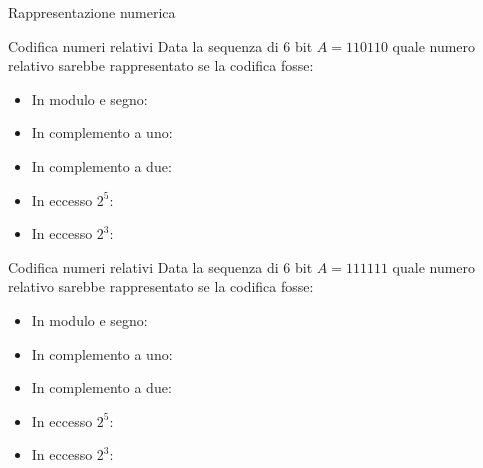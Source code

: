 \documentclass[11pt]{article}
\begin{document}
\begin{quiz}{Rappresentazione numerica}
\begin{cloze}[points=1,shuffle=false]{Codifica numeri relativi}
Data la sequenza di 6 bit $A = 110110$ quale numero relativo sarebbe rappresentato se la codifica fosse:

\begin{itemize}
\item In modulo e segno: 
\item In complemento a uno: 
\item In complemento a due: 
\item In eccesso $2^5$: 
\item In eccesso $2^3$: 
\end{itemize}
\end{cloze}

\begin{cloze}[points=1,shuffle=false]{Codifica numeri relativi}
Data la sequenza di 6 bit $A = 111111$ quale numero relativo sarebbe rappresentato se la codifica fosse:

\begin{itemize}
\item In modulo e segno: 
\item In complemento a uno: 
\item In complemento a due: 
\item In eccesso $2^5$: 
\item In eccesso $2^3$: 
\end{itemize}


\end{cloze}
\end{quiz}
\end{document}
